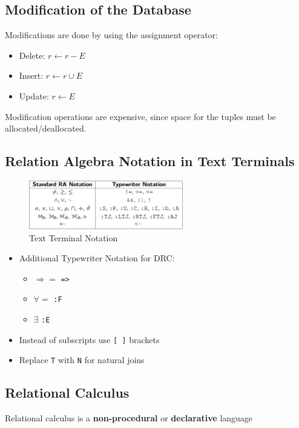 \subsection{Modification of the Database}
Modifications are done by using the assignment operator:
\begin{itemize}[label=\(\rhd\)]
    \item Delete: $r\leftarrow r - E$
    \item Insert: $r \leftarrow r \cup E$
    \item Update: $r \leftarrow E$
\end{itemize}
Modification operations are expensive, since space for the tuples must be allocated/deallocated.
\subsection{Relation Algebra Notation in Text Terminals}

\begin{figure}[H]
\centering
\includegraphics[width=0.6\textwidth]{images/Screenshot 2024-05-04 at 10.44.01.jpg}
\caption{Text Terminal Notation}
\end{figure}
\begin{itemize}[label=\(\rhd\)]
    \item Additional Typewriter Notation for DRC:
    \begin{itemize}[label=\(\rhd\)]
        \item $\Rightarrow=$ \texttt{=>}
        \item $\forall=$ \texttt{:F}
        \item $\exists$ \texttt{:E}
    \end{itemize}
    \item Instead of subscripts use \texttt{[ ]} brackets
    \item Replace \texttt{T} with \texttt{N} for natural joins
\end{itemize}

\subsection{Relational Calculus}

Relational calculus is a \textbf{non-procedural} or \textbf{declarative} language

